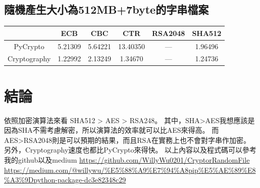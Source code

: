 \documentclass[12pt,a4paper]{article}
\begin{document}
\subsection{隨機產生大小為512MB+7byte的字串檔案}
{
	\begin{frame}
	\par
	\bigskip
	\begin{center}
	\begin{tabular}{|c|c|c|c|c|c|} \hline
	\textsc{} & ECB & CBC & CTR & RSA2048 & SHA512 \\ \hline
	PyCrypto & 5.21309 & 5.64221 & 13.40350 & --- & 1.96496\\ \hline
	Cryptography & 1.22992 & 2.13249 & 1.34670 & --- & 1.24736\\ \hline
	\end{tabular}
	\end{center}
	\par
	\bigskip
	\end{frame}
}

\section{結論}
依照加密演算法來看 SHA512 > AES > RSA248。
\newline 其中，SHA>AES我想應該是因為SHA不需考慮解密，所以演算法的效率就可以比AES來得高。
\newline 而AES>RSA2048則是可以預期的結果，而且RSA在實務上也不會對字串作加密。
\newline 另外，Cryptography速度也都比PyCrypto來得快。
\newline
\newline 以上內容以及程式碼可以參考我的github以及medium
\newline
\url{https://github.com/WillyWu0201/CryptorRandomFile}
\newline
\url{https://medium.com/@willywu/%E5%88%A9%E7%94%A8pip%E5%AE%89%E8%A3%9Dpython-package-dc3e82348c29}
\end{document}
